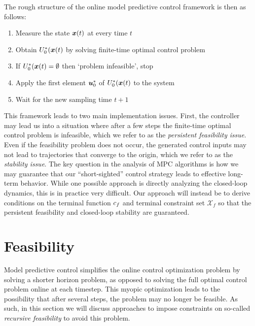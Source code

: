 The rough structure of the online model predictive control framework is then as follows:
\begin{enumerate}
    \item Measure the state $\bm{x}(t)$ at every time $t$
    \item Obtain $U^*_0(\bm{x}(t)$ by solving finite-time optimal control problem
    \item If $U^*_0(\bm{x}(t) = \emptyset$ then `problem infeasible', stop
    \item Apply the first element $\bm{u}^*_0$ of $U^*_0(\bm{x}(t)$ to the system
    \item Wait for the new sampling time $t+1$
\end{enumerate}
This framework leads to two main implementation issues. First, the controller may lead us into a situation where after a few steps the finite-time optimal control problem is infeasible, which we refer to as the \textit{persistent feasibility issue}. Even if the feasibility problem does not occur, the generated control inputs may not lead to trajectories that converge to the origin, which we refer to as the \textit{stability issue}. The key question in the analysis of MPC algorithms is how we may guarantee that our ``short-sighted'' control strategy leads to effective long-term behavior. While one possible approach is directly analyzing the closed-loop dynamics, this is in practice very difficult. Our approach will instead be to derive conditions on the terminal function $c_f$ and terminal constraint set $\mathcal{X}_f$ so that the persistent feasibility and closed-loop stability are guaranteed. 

\section{Feasibility}

Model predictive control simplifies the online control optimization problem by solving a shorter horizon problem, as opposed to solving the full optimal control problem online at each timestep. This myopic optimization leads to the possibility that after several steps, the problem may no longer be feasible. As such, in this section we will discuss approaches to impose constraints on so-called \textit{recursive feasibility} to avoid this problem. 

